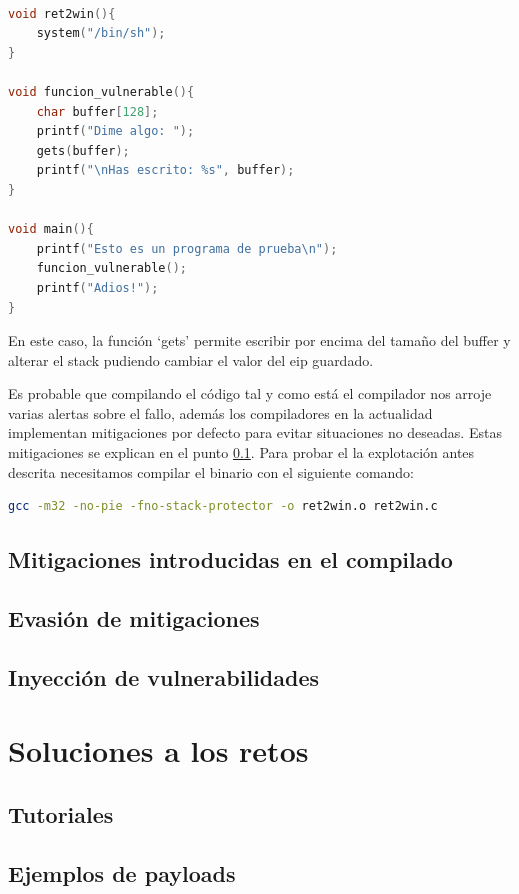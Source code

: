 \begin{lstlisting}[language=C, caption=Código vulnerable con función ret2win]

void ret2win(){
    system("/bin/sh");
}

void funcion_vulnerable(){
    char buffer[128];
    printf("Dime algo: ");
    gets(buffer);
    printf("\nHas escrito: %s", buffer);
}

void main(){
    printf("Esto es un programa de prueba\n");
    funcion_vulnerable();
    printf("Adios!");
}
\end{lstlisting}
\FloatBarrier
En este caso, la función `gets' permite escribir por encima del tamaño del buffer y alterar el stack pudiendo cambiar el valor del \acrshort{eip} guardado.

Es probable que compilando el código tal y como está el compilador nos arroje varias alertas sobre el fallo, además los compiladores en la actualidad implementan mitigaciones por defecto para evitar situaciones no deseadas.
Estas mitigaciones se explican en el punto \ref{subsec:mitigaciones}.
Para probar el la explotación antes descrita necesitamos compilar el binario con el siguiente comando:
\begin{lstlisting}[language=bash, caption=Compilado de código con pocas mitigaciones y arquitectura 32bit]
gcc -m32 -no-pie -fno-stack-protector -o ret2win.o ret2win.c
\end{lstlisting}

\subsection{Mitigaciones introducidas en el compilado} \label{subsec:mitigaciones}
\subsection{Evasión de mitigaciones}
\subsection{Inyección de vulnerabilidades} \label{subsec:vulns}
\section{Soluciones a los retos}
\subsection{Tutoriales}
\subsection{Ejemplos de payloads}